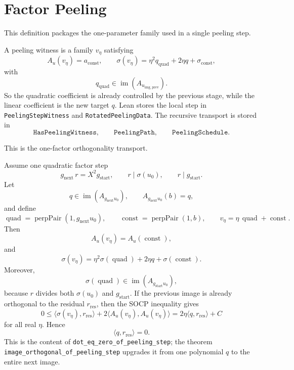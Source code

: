 \section{Factor Peeling}

This definition packages the one-parameter family used in a single peeling
step.
\begin{definition}\label{def:peeling-witness}
\leanok
A peeling witness is a family $v_\eta$ satisfying
\[
A_u(v_\eta)=a_{\mathrm{const}},
\qquad
\sigma(v_\eta)=\eta^2 q_{\mathrm{quad}} + 2\eta q + \sigma_{\mathrm{const}},
\]
with
\[
q_{\mathrm{quad}} \in \operatorname{im}(A_{u_{\mathrm{img,prev}}}).
\]
So the quadratic coefficient is already controlled by the previous stage, while
the linear coefficient is the new target $q$. Lean stores the local step in
\texttt{PeelingStepWitness} and \texttt{RotatedPeelingData}. The recursive
transport is stored in
\[
\texttt{HasPeelingWitness},\qquad
\texttt{PeelingPath},\qquad
\texttt{PeelingSchedule}.
\]
\end{definition}

This is the one-factor orthogonality transport.
\begin{proposition}\label{prop:one-step-peeling}
\leanok
Assume one quadratic factor step
\[
g_{\mathrm{next}}\,r = X^2 g_{\mathrm{start}},
\qquad
r \mid \sigma(u_0),
\qquad
r \mid g_{\mathrm{start}}.
\]
Let
\[
q\in \operatorname{im}(A_{g_{\mathrm{next}}u_0}),
\qquad
A_{g_{\mathrm{next}}u_0}(b)=q,
\]
and define
\[
\operatorname{quad}=\operatorname{perpPair}(1,g_{\mathrm{next}}u_0),
\qquad
\operatorname{const}=\operatorname{perpPair}(1,b),
\qquad
v_\eta=\eta\,\operatorname{quad}+\operatorname{const}.
\]
Then
\[
A_u(v_\eta)=A_u(\operatorname{const}),
\]
and
\[
\sigma(v_\eta)=
\eta^2 \sigma(\operatorname{quad})
 + 2\eta q
 + \sigma(\operatorname{const}).
\]
Moreover,
\[
\sigma(\operatorname{quad})\in \operatorname{im}(A_{g_{\mathrm{start}}u_0}),
\]
because $r$ divides both $\sigma(u_0)$ and $g_{\mathrm{start}}$. If the
previous image is already orthogonal to the residual $r_{\mathrm{res}}$, then
the SOCP inequality gives
\[
0 \le
\langle \sigma(v_\eta),r_{\mathrm{res}}\rangle
 + 2\langle A_u(v_\eta),A_u(v_\eta)\rangle
= 2\eta \langle q,r_{\mathrm{res}}\rangle + C
\]
for all real $\eta$. Hence
\[
\langle q,r_{\mathrm{res}}\rangle = 0.
\]
This is the content of \texttt{dot\_eq\_zero\_of\_peeling\_step}; the theorem
\texttt{image\_orthogonal\_of\_peeling\_step} upgrades it from one polynomial
$q$ to the entire next image.
\end{proposition}

